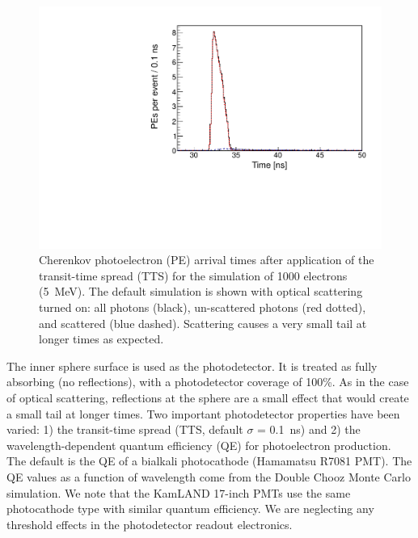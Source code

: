 \documentclass[cits]{JINST}
\begin{document}
\begin{figure}
        \begin{center}
        \includegraphics[scale=0.4]{graphs2/PEtime_Cerenkov_scattered_vs_unscattered.pdf}
        \caption[]{Cherenkov photoelectron (PE) arrival times after application
        of the transit-time spread (TTS) for the simulation
        of 1000 electrons (5~MeV). The default simulation is shown with optical scattering turned on: all photons (black), un-scattered photons (red dotted), and scattered (blue dashed). Scattering causes a very small tail at longer times as expected. \label{scattplot}}
        \end{center}
\end{figure}

The inner sphere surface is used as the photodetector. It is treated
as fully absorbing (no reflections), with a photodetector coverage of
100\%. As in the case of optical scattering, reflections at the sphere are a small effect that would create a small tail at longer times. Two important photodetector properties have been varied: 1)
the transit-time spread (TTS, default $\sigma$ = 0.1~ns) and 2) the
wavelength-dependent quantum efficiency (QE) for photoelectron
production. The default is the QE of a bialkali photocathode (Hamamatsu
R7081 PMT)\cite{Hamamatsu_R7081}. The QE values as a function of wavelength come from the Double Chooz\cite{dctwo}
Monte Carlo simulation. We note that the KamLAND 17-inch PMTs use the
same photocathode type with similar quantum efficiency. We are neglecting any threshold effects in the photodetector readout electronics.
\end{document}

